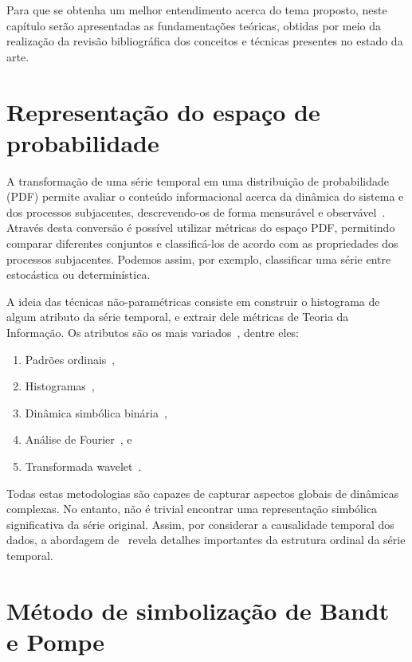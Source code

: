 
Para que se obtenha um melhor entendimento acerca do tema proposto, neste  capítulo  serão  apresentadas  as  fundamentações  teóricas, obtidas por meio da realização da revisão bibliográfica dos conceitos e técnicas presentes no estado da arte.

\section{Representação do espaço de probabilidade}

A transformação de uma série temporal em uma distribuição de probabilidade (PDF) permite avaliar o conteúdo informacional acerca da dinâmica do sistema e dos processos subjacentes, descrevendo-os de forma mensurável e observável~\citep{entropyAndInformationTheory}.
Através desta conversão é possível utilizar métricas do espaço PDF, permitindo comparar diferentes conjuntos e classificá-los de acordo com as propriedades dos processos subjacentes. 
Podemos assim, por exemplo, classificar uma série entre estocástica ou determinística.

A ideia das técnicas não-paramétricas consiste em construir o histograma de algum atributo da série temporal, e extrair dele métricas de Teoria da Informação.
Os atributos são os mais variados~\citep{Kowalski2011DistancesIP}, dentre eles: 
\begin{enumerate}[label=(\alph*)]
\item Padrões ordinais~\citep{ROSSO2},
\item Histogramas~\citep{article3,DEMICCO20083373},
\item Dinâmica simbólica binária~\citep{PhysRevLett},
\item Análise de Fourier~\citep{article}, e 
\item Transformada wavelet~\citep{ROSSO3}. 
\end{enumerate}

Todas estas metodologias são capazes de capturar aspectos globais de dinâmicas complexas. 
No entanto, não é trivial encontrar uma representação simbólica significativa da série original. 
Assim, por considerar a causalidade temporal dos dados, a abordagem de~\citet{article2} revela detalhes importantes da estrutura ordinal da série temporal.

\section{Método de simbolização de Bandt e Pompe }

